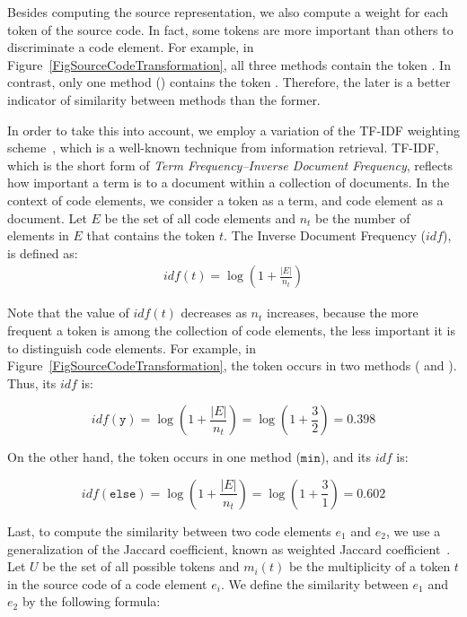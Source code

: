 Besides computing the source representation, we also compute a weight for each token
of the source code.
In fact, some tokens are more important than others to discriminate a code element.
For example, in Figure~\ref{FigSourceCodeTransformation}, all three methods contain the token . In contrast, only one method () contains the token . Therefore, the later is a better indicator of similarity between methods than the former.

In order to take this into account, we employ a variation of the TF-IDF weighting scheme~\cite{salton1986introduction}, which is a well-known technique from information retrieval.
TF-IDF, which is the short form of \emph{Term Frequency–Inverse Document Frequency}, reflects how important a term is to a document within a collection of documents.
In the context of code elements, we consider a token as a term, and code element as a document.
Let $E$ be the set of all code elements and $n_t$ be the number of elements in $E$ that contains the token $t$. The Inverse Document Frequency ($\mathit{idf}$), is defined as:
\begin{align}
\mathit{idf}(t) = \log (1 + \frac{|E|}{n_t})
\end{align}

Note that the value of $\mathit{idf}(t)$ decreases as $n_t$ increases, because the more frequent a token is among the collection of code elements, the less important it is to distinguish code elements.
For example, in Figure~\ref{FigSourceCodeTransformation}, the token  occurs in two methods ( and ). Thus, its $\mathit{idf}$ is:

\[
\mathit{idf}(\mathtt{y}) = 
\log (1 + \frac{|E|}{n_t}) = 
\log (1 + \frac{3}{2}) = 0.398
\]

On the other hand, the token  occurs in one method ($\mathtt{min}$), and its $\mathit{idf}$ is:

\[
\mathit{idf}(\mathtt{else}) = 
\log (1 + \frac{|E|}{n_t}) = 
\log (1 + \frac{3}{1}) = 0.602
\]

Last, to compute the similarity between two code elements $e_1$ and $e_2$, we use a generalization of the Jaccard coefficient, known as weighted Jaccard coefficient~\cite{chierichetti2010finding}.
Let $U$ be the set of all possible tokens and $m_i(t)$ be the multiplicity of a token $t$ in the source code of a code element $e_i$.
We define the similarity between $e_1$ and $e_2$ by the following formula:


